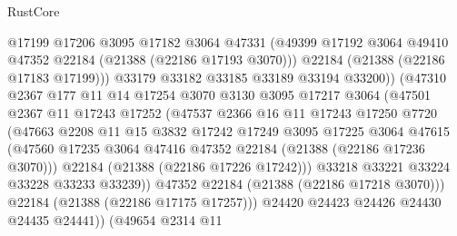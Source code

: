 \begin{lexlean}{RustCore}
\begin{coremodule}
                          @17199
                          @17206
                          @3095
                          @17182
                          @3064
                          @47331
                          (@49399 @17192 @3064 @49410 @47352 @22184 (@21388 (@22186 @17193 @3070)))
                          @22184
                          (@21388 (@22186 @17183 @17199)))
                        @33179
                        @33182
                        @33185
                        @33189
                        @33194
                        @33200))
                    (@47310
                      @2367
                      @177
                      @11
                      @14
                      @17254
                      @3070
                      @3130
                      @3095
                      @17217
                      @3064
                      (@47501
                        @2367
                        @11
                        @17243
                        @17252
                        (@47537
                          @2366
                          @16
                          @11
                          @17243
                          @17250
                          @7720
                          (@47663
                            @2208
                            @11
                            @15
                            @3832
                            @17242
                            @17249
                            @3095
                            @17225
                            @3064
                            @47615
                            (@47560
                              @17235
                              @3064
                              @47416
                              @47352
                              @22184
                              (@21388 (@22186 @17236 @3070)))
                            @22184
                            (@21388 (@22186 @17226 @17242)))
                          @33218
                          @33221
                          @33224
                          @33228
                          @33233
                          @33239))
                      @47352
                      @22184
                      (@21388 (@22186 @17218 @3070)))
                    @22184
                    (@21388 (@22186 @17175 @17257)))
                  @24420
                  @24423
                  @24426
                  @24430
                  @24435
                  @24441))
              (@49654
                @2314
                @11

\end{coremodule}
\end{lexlean}
